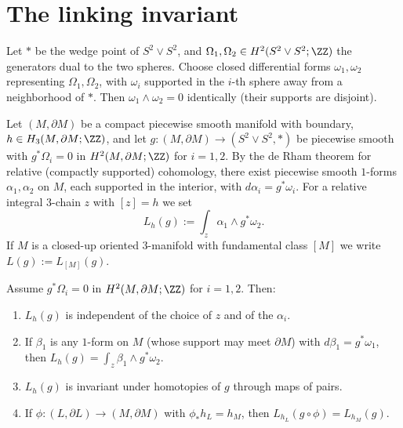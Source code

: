 \section{The linking invariant}

Let $*$ be the wedge point of $S^2\vee S^2$, and $\Omega_1,\Omega_2\in H^2(S^2\vee S^2;\ZZ)$ the generators dual to the two spheres. Choose closed differential forms $\omega_1,\omega_2$ representing $\Omega_1,\Omega_2$, with $\omega_i$ supported in the $i$-th sphere away from a neighborhood of $*$. Then $\omega_1\wedge\omega_2=0$ identically (their supports are disjoint).

Let $(M,\partial M)$ be a compact piecewise smooth manifold with boundary, $h\in H_3(M,\partial M;\ZZ)$, and let $g:(M,\partial M)\to(S^2\vee S^2,*)$ be piecewise smooth with $g^*\Omega_i=0$ in $H^2(M,\partial M;\ZZ)$ for $i=1,2$. By the de Rham theorem for relative (compactly supported) cohomology, there exist piecewise smooth $1$-forms $\alpha_1,\alpha_2$ on $M$, each supported in the interior, with $d\alpha_i=g^*\omega_i$. For a relative integral $3$-chain $z$ with $[z]=h$ we set
\[
L_h(g):=\int_z \alpha_1\wedge g^*\omega_2 .
\]
If $M$ is a closed-up oriented $3$-manifold with fundamental class $[M]$ we write $L(g):=L_{[M]}(g)$.

\begin{lemma}\label{link}
Assume $g^*\Omega_i=0$ in $H^2(M,\partial M;\ZZ)$ for $i=1,2$. Then:
\begin{enumerate}
\item $L_h(g)$ is independent of the choice of $z$ and of the $\alpha_i$.
\item If $\beta_1$ is any $1$-form on $M$ (whose support may meet $\partial M$) with $d\beta_1=g^*\omega_1$, then $L_h(g)=\int_z\beta_1\wedge g^*\omega_2$.
\item $L_h(g)$ is invariant under homotopies of $g$ through maps of pairs.
\item If $\phi:(L,\partial L)\to(M,\partial M)$ with $\phi_*h_L=h_M$, then $L_{h_L}(g\circ\phi)=L_{h_M}(g)$.
\end{enumerate}
\end{lemma}

